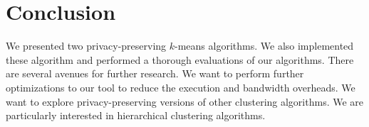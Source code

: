 \section{Conclusion}

We presented two privacy-preserving $k$-means algorithms. We also
implemented these algorithm and performed a thorough evaluations of
our algorithms. There are several avenues for further research. We
want to perform further optimizations to our tool to reduce the
execution and bandwidth overheads. We want to explore
privacy-preserving versions of other clustering algorithms. We are
particularly interested in hierarchical clustering algorithms.
